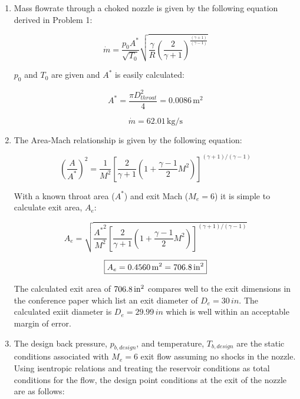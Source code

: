\documentclass[../main.tex]{subfiles}
\begin{document}
\begin{enumerate}[label=(\alph*)]

    \item Mass flowrate through a choked nozzle is given by the following equation derived in Problem 1:
    
    \[
        \dot{m} = \frac{p_0 A^*}{\sqrt{T_0}} \sqrt{\frac{\gamma}{R} \left({\frac{2}{\gamma+1}}\right)^{\frac{(\gamma+1)}{(\gamma-1)}}}
    \]

    \(p_0\) and \(T_0\) are given and \(A^*\) is easily calculated:

    \[
        A^* = \frac{\pi D_{throat}^2}{4} =  0.0086 \, \unit{\meter\squared}
    \]

    \[
        \boxed{
        \dot{m} = 62.01 \,\unit{\kilogram/\second}
        }
    \]

    \item The Area-Mach relationship is given by the following equation:
    
    \[
        {\left({\frac{A}{A^*}}\right)}^2
        =
        \frac{1}{M^2}
        {\left[{
            \frac{2}{\gamma+1}
            \left({1 + \frac{\gamma-1}{2}M^2}\right)
        }\right]}^{(\gamma+1)/(\gamma-1)}
    \]

    With a known throat area (\(A^*\)) and exit Mach (\(M_e=6\)) it is simple to calculate exit area, \(A_e\):

    \[
        A_e
        =
        \sqrt{
        \frac{{A^*}^2}{M^2}
        {\left[{
            \frac{2}{\gamma+1}
            \left({1 + \frac{\gamma-1}{2}M^2}\right)
        }\right]}^{(\gamma+1)/(\gamma-1)}
        }
    \]

    \[
        \boxed{A_e =  0.4560\,\unit{\meter\squared} = 706.8 \, \unit{in\squared}}
    \]

    The calculated exit area of \(706.8\,\unit{in\squared}\) compares well to the exit dimensions in the conference paper which list an exit diameter of \(D_{e}=30\,\unit{in}\).
    The calculated exiit diameter is \(D_e = 29.99\,\unit{in}\) which is well within an acceptable margin of error.

    \item The design back pressure, \(p_{b,design}\), and temperature, \(T_{b,design}\) are the static conditions associated with \(M_e=6\) exit flow assuming no shocks in the nozzle.
    Using isentropic relations and treating the reservoir conditions as total conditions for the flow, the design point conditions at the exit of the nozzle are as follows:


\end{enumerate}
\end{document}
